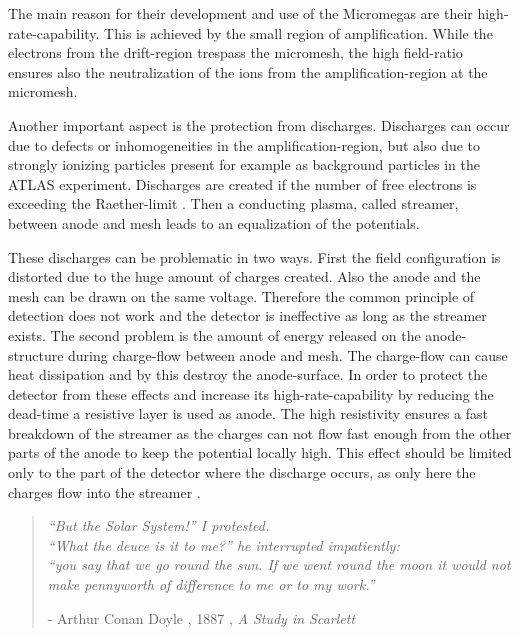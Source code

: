 \documentclass[
twoside,            %
BCOR1.4cm,          %
10pt,               %
headings=normal,    %
headsepline,        %
clearplainpage,		%
final,              %
div=14,
open=right,
bibliography=toc
]{scrreprt}
\begin{document}
The main reason for their development and use of the Micromegas are their high-rate-capability.
This is achieved by the small region of amplification.
While the electrons from the drift-region trespass the micromesh, the high field-ratio ensures also the neutralization of the ions from the amplification-region at the micromesh.

Another important aspect is the protection from discharges.
Discharges can occur due to defects or inhomogeneities in the amplification-region, but also due to strongly ionizing particles present for example as background particles in the ATLAS experiment.
Discharges are created if the number of free electrons is exceeding the Raether-limit 
\cite{raetherLimit}.
Then a conducting plasma, called streamer, between anode and mesh leads to an equalization of the potentials. 

These discharges can be problematic in two ways.
First the field configuration is distorted due to the huge amount of charges created.
Also the anode and the mesh can be drawn on the same voltage.
Therefore the common principle of detection does not work and the detector is ineffective as long as the streamer exists.
The second problem is the amount of energy released on the anode-structure during charge-flow between anode and mesh.
The charge-flow can cause heat dissipation and by this destroy the anode-surface.
In order to protect the detector from these effects and increase its high-rate-capability by reducing the dead-time a resistive layer is used as anode.
The high resistivity ensures a fast breakdown of the streamer as the charges can not flow fast enough from the other parts of the anode to keep the potential locally high.
This effect should be limited only to the part of the detector where the discharge occurs, as only here the charges flow into the streamer
\cite{sparkResistantMicromegas}.

\vspace*{\fill} 
\begin{quote} 
	\textit{
		``But the Solar System!'' I protested.
		\\
		``What the deuce is it to me?'' he interrupted impatiently:
		\\
		``you say that we go round the sun. If we went round the moon it would not make pennyworth of difference to me or to my work.''
	}
	
	\hfill - Arthur Conan Doyle , 1887 , \textit{A Study in Scarlett}
\end{quote}
\vspace*{\fill}
\end{document}
